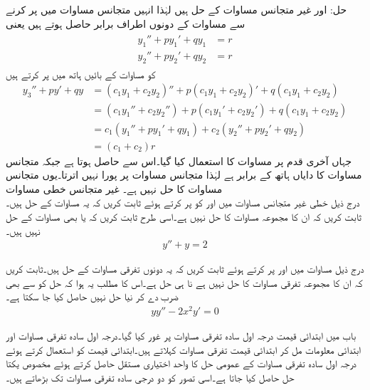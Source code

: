 حل: اور  غیر متجانس مساوات کے حل ہیں لہٰذا انہیں متجانس مساوات میں پر کرنے سے مساوات کے دونوں اطراف برابر حاصل ہوتے ہیں یعنی
\begin{gather}
\begin{aligned}\label{مساوات_سادہ_دو_درجی_غیر_متجانس_حل_الف}
y_1''+py_1'+qy_1&=r\\
y_2''+py_2'+qy_2&=r
\end{aligned}
\end{gather}
 کو مساوات کے بائیں ہاتھ میں پر کرتے ہیں
\begin{align*}
y_3''+py'+qy&=(c_1y_1+c_2y_2)''+p(c_1y_1+c_2y_2)'+q(c_1y_1+c_2y_2)\\
&=(c_1y_1''+c_2y_2'')+p(c_1y_1'+c_2y_2')+q(c_1y_1+c_2y_2)\\
&=c_1(y_1''+py_1'+qy_1)+c_2(y_2''+py_2'+qy_2)\\
&=(c_1+c_2)r
\end{align*}
 جہاں آخری قدم پر مساوات  کا استعمال کیا گیا۔اس سے  حاصل ہوتا ہے جبکہ متجانس مساوات کا دایاں ہاتھ  کے برابر ہے لہٰذا  متجانس مساوات پر پورا نہیں اترتا۔یوں  متجانس مساوات کا حل نہیں ہے۔
\quad غیر متجانس خطی مساوات\\
درج ذیل خطی غیر متجانس مساوات میں  اور  کو پر کرتے ہوئے ثابت کریں کہ یہ مساوات کے حل ہیں۔ثابت کریں کہ ان کا مجموعہ مساوات کا حل نہیں ہے۔اسی طرح ثابت کریں کہ  یا  بھی مساوات کے حل نہیں ہیں۔
\begin{align*}
y''+y=2
\end{align*}

درج ذیل مساوات میں  اور  پر کرتے ہوئے ثابت کریں کہ یہ دونوں تفرقی مساوات کے حل ہیں۔ثابت کریں کہ ان کا مجموعہ تفرقی مساوات کا حل نہیں ہے نا ہی  حل ہے۔اس کا مطلب یہ ہوا کہ حل کو  سے بھی ضرب دے کر نیا حل نہیں حاصل کیا جا سکتا ہے۔
\begin{align*}
yy''-2x^2y'=0
\end{align*}

باب  میں ابتدائی قیمت درجہ اول سادہ تفرقی مساوات پر غور کیا گیا۔درجہ اول سادہ تفرقی مساوات اور ابتدائی معلومات  مل کر ابتدائی قیمت تفرقی مساوات کہلاتے ہیں۔ابتدائی قیمت کو استعمال کرتے ہوئے درجہ اول سادہ تفرقی مساوات کے عمومی حل کا واحد اختیاری مستقل  حاصل کرتے ہوئے مخصوص یکتا حل حاصل کیا جاتا ہے۔اسی تصور کو دو درجی سادہ تفرقی مساوات تک بڑھاتے ہیں۔

